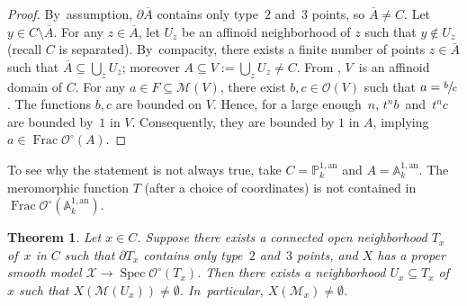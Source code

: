 \documentclass[JEP,XML,SOM,Unicode,NoFloatCountersInSection,published]{cedram}
\DeclareMathOperator{\Frac}{Frac}
\DeclareMathOperator{\Spec}{Spec}
\let\backslash\setminus
\newtheorem{thm}{Theorem}[section]
\theoremstyle{definition}
\begin{document}
\begin{proof}
By~assumption, $\partial{\overline{A}}$ contains only type~$2$ and~3 points, so $\overline{A} \neq C$. Let $y \in C \backslash \overline{A}$. For any $z \in \overline{A}$, let $U_z$ be an affinoid neighborhood of $z$ such that $y \not\in U_z$ (recall $C$ is separated). By~compacity, there exists a finite number of points $z \in \overline{A}$ such that $\overline{A} \subseteq \bigcup_{z} U_z$; moreover $A \subseteq V:=\bigcup_{z} U_z \neq C$. From \cite[Th.\,1.8.15(2)]{doktoratura}, $V$~is an affinoid domain of $C$. For any $a \in F \subseteq \mathscr{M}(V)$, there exist $b, c \in \mathcal{O}(V)$ such that $a=\sfrac{b}{c}$. The functions $b,c$ are bounded on $V$. Hence, for a large enough~$n$, $t^nb$~and~$t^nc$ are bounded by~$1$ in $V$. Consequently, they are bounded by $1$ in $A$, implying $a \in \Frac \mathcal{O}^{\circ}(A)$.
\end{proof}

To see why the statement is not always true, take $C=\mathbb{P}_k^{1, \mathrm{an}}$ and $A=\mathbb{A}_k^{1, \mathrm{an}}$. The meromorphic function $T$ (after a choice of coordinates) is not contained in $\Frac \mathcal{O}^{\circ}(\mathbb{A}_k^{1, \mathrm{an}})$.

\begin{thm} \label{1.5}
Let $x\in C$. Suppose there exists a connected open neighborhood $T_x$ of~$x$ in $C$ such that $\partial{T_x}$ contains only type~$2$ and~$3$ points, and $X$ has a proper smooth model ${\mathcal{X} \to \Spec \mathcal{O}^{\circ}(T_x)}$. Then there exists a neighborhood $U_x \subseteq T_x$ of $x$ such that ${X(\mathscr{M}(U_x)) \neq \emptyset}$. In~particular, $X(\mathscr{M}_x) \neq \emptyset$.
\end{thm}
\end{document}
